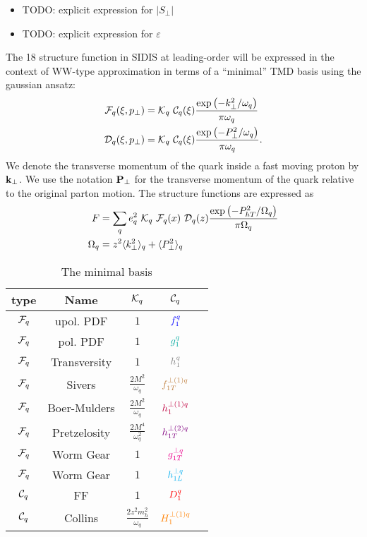 \documentclass[floatfix,aps,prd,nofootinbib,superscriptaddress,preprint]{revtex4}
\newcommand\3[1]{\boldsymbol{#1}}
\newcommand{\bfkperp}{{\bf k}_\perp}
\newcommand{\bfpperp}{{\bf P}_\perp}
\newcommand{\Phperp}{P_{hT}}
\begin{document}
\begin{itemize}
\item {\color{red} TODO: explicit expression for $|S_{\perp}|$}
\item {\color{red} TODO: explicit expression for $\varepsilon$}
\end{itemize}

The 18 structure function in SIDIS at leading-order will be expressed
in the context of WW-type approximation in terms of a ``minimal''
TMD basis using the gaussian ansatz:
%
\begin{align}
{\cal F}_q(\xi,p_{\perp})&={\cal K}_q ~ {\cal C}_q(\xi) \frac{\exp\left(-k_{\perp}^2/\omega_q\right)}{\pi \omega_q}\\
{\cal D}_q(\xi,p_{\perp})&={\cal K}_q ~ {\cal C}_q(\xi) \frac{\exp\left(-P_{\perp}^2/\omega_q\right)}{\pi \omega_q}.
\end{align}
%
We denote the transverse momentum of the quark inside a fast moving
proton by $\bfkperp$. We use the notation $\bfpperp$ for the
transverse momentum of the quark relative to the original parton
motion. The structure functions are expressed as
%
\begin{align}
F&=\sum_q e_q^2 ~ {\cal K}_q ~ {\cal F}_q(x) ~{\cal D}_q(z) \frac{\exp\left(-\Phperp^2/\Omega_q\right)}{\pi \Omega_q}\\
\Omega_q&=z^2\avk + \avp
\end{align}

%

\begin{table}[h!]
\begin{tabular}{|c|c|c|c|c|}
\hline
type       & Name         & ${\cal K}_q$                  & ${\cal C}_q$    \\\hline
${\cal F}_q$ & upol. PDF    & $1$                           & ${\color{blue} f_1^q}$          \\\hline
${\cal F}_q$ & pol. PDF     & $1$                           & $\ppdf$         \\\hline
${\cal F}_q$ & Transversity & $1$                           & $\transversity$ \\\hline
${\cal F}_q$ & Sivers       & $\frac{2M^2}{\omega_q}$       & ${\color{brown} f^{\perp(1)q}_{1T}}$       \\\hline
${\cal F}_q$ & Boer-Mulders & $\frac{2M^2}{\omega_q}$       & ${\color{purple} h^{\perp(1)q}_1 }$  \\\hline
${\cal F}_q$ & Pretzelosity & $\frac{2M^4}{\omega_q^2}$       & ${\color{violet} h^{\perp(2)q}_{1T} }$ \\\hline
${\cal F}_q$ & Worm Gear    & $1$                           & ${\color{magenta} g^{\perp q}_{1T}}$          \\\hline
${\cal F}_q$ & Worm Gear    & $1$                           & ${\color{cyan}h^{\perp q}_{1L}}$          \\\hline
\hline
${\cal C}_q$ & FF           & $1$                           & ${\color{red} D_1^{q}}$           \\\hline
${\cal C}_q$ & Collins      & $\frac{2z^2 m_h^2}{\omega_q}$ & ${\color{orange} H^{\perp(1)q}_{1} }$      \\\hline
\end{tabular}
\caption{The minimal basis}
\label{t.mbasis}
\end{table}
\end{document}
